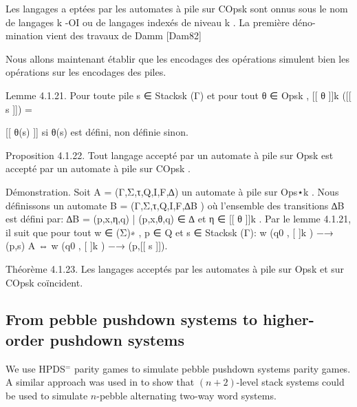 \documentclass[a4paper,UKenglish,cleveref, autoref, thm-restate]{lipics-v2021}
\begin{document}
Les langages a eptées par les automates à pile sur COpsk sont onnus sous
le nom de langages k -OI ou de langages indexés de niveau k . La première déno-
mination vient des travaux de Damm [Dam82]

Nous allons maintenant établir que les encodages des opérations simulent bien
les opérations sur les encodages des piles.

Lemme 4.1.21. Pour toute pile s ∈ Stacksk (Γ) et pour tout θ ∈ Opsk ,
[[ θ ]]k ([[ s ]]) =
{
[[ θ(s) ]]		si θ(s) est défini,	
non définie		sinon.


Proposition 4.1.22. Tout langage accepté par un automate à pile sur Opsk est
accepté par un automate à pile sur COpsk .

Démonstration. Soit A = (Γ,Σ,τ,Q,I,F,∆) un automate à pile sur Ops⋆k . Nous
définissons un automate B = (Γ,Σ,τ,Q,I,F,∆B ) où l'ensemble des transitions ∆B
est défini par:
∆B = {(p,x,η,q) | (p,x,θ,q) ∈ ∆ et η ∈ [[ θ ]]k }.
Par le lemme 4.1.21, il suit que pour tout w ∈ (Σ)∗ , p ∈ Q et s ∈ Stacksk (Γ):
w
(q0 , [ ]k ) −→ (p,s)
A
⇔
w
(q0 , [ ]k ) −→ (p,[[ s ]]).

Théorème 4.1.23. Les langages acceptés par les automates à pile sur Opsk et
sur COpsk coïncident.


\fi




\subsection{From pebble pushdown 
systems 
to higher-order pushdown 
systems
}



We use HPDS$^=$ parity games to simulate pebble pushdown systems
parity games.
A similar approach was used in \cite{carayol2006automates} to show that $(n + 2)$-level stack
systems could be used to simulate $n$-pebble alternating two-way word systems.


}
\end{document}

